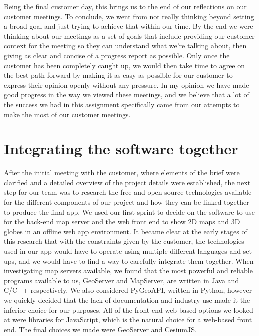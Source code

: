 \documentclass{l3proj}
\begin{document}
Being the final customer day, this brings us to the end of our reflections on our customer meetings. To conclude, we went from not really thinking beyond setting a broad goal and just trying to achieve that within our time. By the end we were thinking about our meetings as a set of goals that include providing our customer context for the meeting so they can understand what we’re talking about, then giving as clear and concise of a progress report as possible. Only once the customer has been completely caught up, we would then take time to agree on the best path forward by making it as easy as possible for our customer to express their opinion openly without any pressure. In my opinion we have made good progress in the way we viewed these meetings, and we believe that a lot of the success we had in this assignment specifically came from our attempts to make the most of our customer meetings.\par


\label{sec:Software}
\section{Integrating the software together}
After the initial meeting with the customer, where elements of the brief were clarified and a detailed overview of the project details were established, the next step for our team was to research the free and open-source technologies available for the different components of our project and how they can be linked together to produce the final app. We used our first sprint to decide on the software to use for the back-end map server and the web front end to show 2D maps and 3D globes in an offline web app environment. It became clear at the early stages of this research that with the constraints given by the customer, the technologies used in our app would have to operate using multiple different languages and set-ups, and we would have to find a way to carefully integrate them together. When investigating map servers available, we found that the most powerful and reliable programs available to us, GeoServer and MapServer, are written in Java and C/C++ respectively\cite{GeoServer}\cite{MapServer}. We also considered PyGeoAPI, written in Python, however we quickly decided that the lack of documentation and industry use made it the inferior choice for our purposes. All of the front-end web-based options we looked at \cite{CesiumJS}\cite{WorldwindWeb}\cite{GEEnterprise}\cite{Maptalks} were libraries for JavaScript, which is the natural choice for a web-based front end.\cite{JSUses} The final choices we made were GeoServer and CesiumJS.
\end{document}
